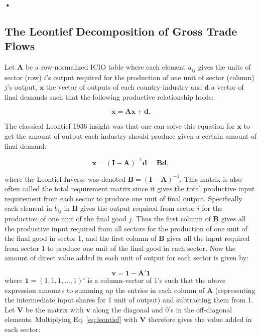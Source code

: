 \textbf{\textbf{•}}\documentclass[a4paper]{article}
\begin{document}
\subsection{The Leontief Decomposition of Gross Trade Flows}

Let $\textbf{A}$ be a row-normalized ICIO table where each element $a_{ij}$ gives the units of sector (row) $i$'s output required for the production of one unit of sector (column) $j$'s output, $\textbf{x}$ the vector of outputs of each country-industry and $\textbf{d}$ a vector of final demands such that the following productive relationship holds:

\begin{equation}
\textbf{x} = \textbf{A}\textbf{x} + \textbf{d}.
\end{equation}

The classical Leontief 1936 insight was that one can solve this equation for $\textbf{x}$ to get the amount of output each industry should produce given a certain amount of final demand:

\begin{equation} \label{eq:leontief}
\textbf{x} = (\textbf{I}-\textbf{A})^{-1} \textbf{d} = \textbf{B}\textbf{d},
\end{equation}

where the Leontief Inverse was denoted $\textbf{B} = (\textbf{I}-\textbf{A})^{-1}$. This matrix is also often called the total requirement matrix since it gives the total productive input requirement from each sector to produce one unit of final output. Specifically each element in $b_{ij}$ in \textbf{B} gives the output required from sector $i$ for the production  of one unit of the final good $j$. Thus the first column of \textbf{B} gives all the productive input required from all sectors for the production of one unit of the final good in sector 1, and the first column of \textbf{B} gives all the input required from sector 1 to produce one unit of the final good in each sector. Now the amount of direct value added in each unit of output for each sector is given by:

\begin{equation}
\textbf{v} = \textbf{1} - \textbf{A}'\textbf{1}
\end{equation}
where $\textbf{1} = (1, 1, 1, ..., 1)'$ is a column-vector of 1's such that the above expression amounts to summing up the entries in each column of \textbf{A} (representing the intermediate input shares for 1 unit of output) and subtracting them from 1. Let \textbf{V} be the matrix with \textbf{v} along the diagonal and 0's in the off-diagonal elements. Multiplying Eq. \ref{eq:leontief} with $\textbf{V}$ therefore gives the value added in each sector:
\end{document}
